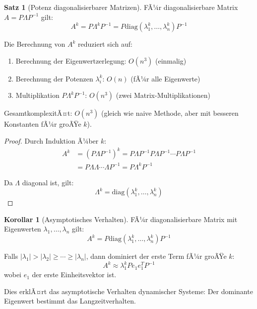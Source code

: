 ﻿\documentclass[a4paper,12pt]{report}
\theoremstyle{definition}
\newtheorem{satz}{Satz}
\newtheorem{korollar}{Korollar}
\begin{document}
	\begin{satz}[Potenz diagonalisierbarer Matrizen]
		FÃ¼r diagonalisierbare Matrix $A = P \Lambda P^{-1}$ gilt:
		\[
		A^k = P \Lambda^k P^{-1} = P \text{diag}(\lambda_1^k, \ldots, \lambda_n^k) P^{-1}
		\]
		
		Die Berechnung von $A^k$ reduziert sich auf:
		\begin{enumerate}
			\item Berechnung der Eigenwertzerlegung: $O(n^3)$ (einmalig)
			\item Berechnung der Potenzen $\lambda_i^k$: $O(n)$ (fÃ¼r alle Eigenwerte)
			\item Multiplikation $P \Lambda^k P^{-1}$: $O(n^3)$ (zwei Matrix-Multiplikationen)
		\end{enumerate}
		
		GesamtkomplexitÃ¤t: $O(n^3)$ (gleich wie naive Methode, aber mit besseren Konstanten fÃ¼r groÃŸe $k$).
	\end{satz}
	
	\begin{proof}
		Durch Induktion Ã¼ber $k$:
		\begin{align}
			A^k &= (P \Lambda P^{-1})^k = P \Lambda P^{-1} P \Lambda P^{-1} \cdots P \Lambda P^{-1} \\
			&= P \Lambda \Lambda \cdots \Lambda P^{-1} = P \Lambda^k P^{-1}
		\end{align}
		
		Da $\Lambda$ diagonal ist, gilt:
		\[
		\Lambda^k = \text{diag}(\lambda_1^k, \ldots, \lambda_n^k)
		\]
	\end{proof}
	
	\begin{korollar}[Asymptotisches Verhalten]
		FÃ¼r diagonalisierbare Matrix mit Eigenwerten $\lambda_1, \ldots, \lambda_n$ gilt:
		\[
		A^k = P \text{diag}(\lambda_1^k, \ldots, \lambda_n^k) P^{-1}
		\]
		
		Falls $|\lambda_1| > |\lambda_2| \geq \cdots \geq |\lambda_n|$, dann dominiert der erste Term fÃ¼r groÃŸe $k$:
		\[
		A^k \approx \lambda_1^k P e_1 e_1^T P^{-1}
		\]
		wobei $e_1$ der erste Einheitsvektor ist.
		
		Dies erklÃ¤rt das asymptotische Verhalten dynamischer Systeme: Der dominante Eigenwert bestimmt das Langzeitverhalten.
	\end{korollar}
	
\end{document}

